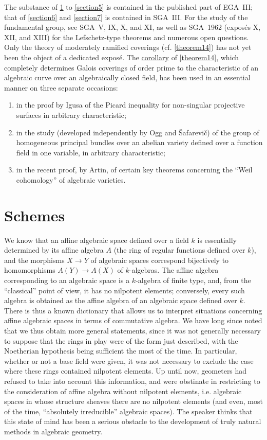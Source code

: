 \documentclass{article}
\theoremstyle{plain}
\theoremstyle{definition}
\newcommand{\oldpage}[1]{\marginpar{\footnotesize$\Big\vert$ \textit{p.~#1}}}
\begin{document}
\oldpage{C-03}
The substance of \cref{section1} to \cref{section5} is contained in the published part of EGA~III; that of \cref{section6} and \cref{section7} is contained in SGA~III.
For the study of the fundamental group, see SGA~V, IX, X, and XI, as well as SGA~1962 (expos\'{e}s X, XII, and XIII) for the Lefschetz-type theorems and numerous open questions.
Only the theory of moderately ramified coverings (cf. \cref{theorem14}) has not yet been the object of a dedicated expos\'{e}.
The \hyperref[theorem14corollary1]{corollary} of \cref{theorem14}, which completely determines Galois coverings of order prime to the characteristic of an algebraic curve over an algebraically closed field, has been used in an essential manner on three separate occasions:
\begin{enumerate}[1.]
  \item in the proof by Igusa of the Picard inequality for non-singular projective surfaces in arbitrary characteristic;
  \item in the study (developed independently by Ogg and \v{S}afarevi\v{c}) of the group of homogeneous principal bundles over an abelian variety defined over a function field in one variable, in arbitrary characteristic;
  \item in the recent proof, by Artin, of certain key theorems concerning the ``Weil cohomology'' of algebraic varieties.
\end{enumerate}


\section{Schemes}
\label{section1}

\oldpage{182-01}
We know that an affine algebraic space defined over a field $k$ is essentially determined by its affine algebra $A$ (the ring of regular functions defined over $k$), and the morphisms $X\to Y$ of algebraic spaces correspond bijectively to homomorphisms $A(Y)\to A(X)$ of $k$-algebras.
The affine algebra corresponding to an algebraic space is a $k$-algebra of finite type, and, from the ``classical'' point of view, it has no nilpotent elements;
conversely, every such algebra is obtained as the affine algebra of an algebraic space defined over $k$.
There is thus a known dictionary that allows us to interpret situations concerning affine algebraic spaces in terms of commutative algebra.
We have long since noted that we thus obtain more general statements, since it was not generally necessary to suppose that the rings in play were of the form just described, with the Noetherian hypothesis being sufficient the most of the time.
In particular, whether or not a base field were given, it was not necessary to exclude the case where these rings contained nilpotent elements.
Up until now, geometers had refused to take into account this information, and were obstinate in restricting to the consideration of affine algebra without nilpotent elements, i.e. algebraic spaces in whose structure sheaves there are no nilpotent elements (and even, most of the time, ``absolutely irreducible'' algebraic spaces).
The speaker thinks that this state of mind has been a serious obstacle to the development of truly natural methods in algebraic geometry.
\end{document}
